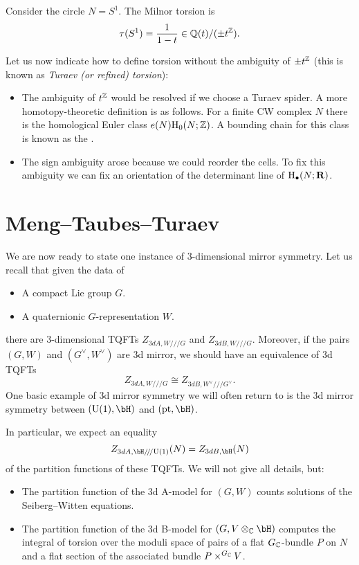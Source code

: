 \begin{example}
	Consider the circle $N=S^1$. The Milnor torsion is
	\[\tau(S^1) = \frac{1}{1-t}\in\mathbb{Q}(t)/(\pm t^{\mathbb{Z}}).\]
\end{example}

Let us now indicate how to define torsion without the ambiguity of $\pm t^{\mathbb{Z}}$ (this is known as \emph{Turaev (or refined) torsion}):
\begin{itemize}
	\item The ambiguity of $t^{\mathbb{Z}}$ would be resolved if we choose a Turaev spider. A more homotopy-theoretic definition is as follows. For a finite CW complex $N$ there is the homological Euler class $e(N)\mathrm{H}_0(N; \mathbb{Z})$. A bounding chain for this class is known as the .
	
	\item The sign ambiguity arose because we could reorder the cells. To fix this ambiguity we can fix an orientation of the determinant line of $\mathrm{H}_\bullet(N;\mathbf{R})$.
\end{itemize}

\section{Meng--Taubes--Turaev}

We are now ready to state one instance of 3-dimensional mirror symmetry. Let us recall that given the data of
\begin{itemize}
	\item A compact Lie group $G$.
	\item A quaternionic $G$-representation $W$.
\end{itemize}
there are 3-dimensional TQFTs $Z_{3dA, W/\!/\!/G}$ and $Z_{3dB, W/\!/\!/G}$. Moreover, if the pairs $(G, W)$ and $(G^\vee, W^\vee)$ are 3d mirror, we should have an equivalence of 3d TQFTs
\[Z_{3dA, W/\!/\!/G}\cong Z_{3dB, W^\vee/\!/\!/G^\vee}.\]
One basic example of 3d mirror symmetry we will often return to is the 3d mirror symmetry between $(\U(1), \bH)$ and $(\pt, \bH)$.

In particular, we expect an equality
\[Z_{3dA, \bH/\!/\!/\U(1)}(N) = Z_{3dB, \bH}(N)\]
of the partition functions of these TQFTs. We will not give all details, but:
\begin{itemize}
	\item The partition function of the 3d A-model for $(G, W)$ counts solutions of the Seiberg--Witten equations.
	\item The partition function of the 3d B-model for $(G, V\otimes_\C \bH)$ computes the integral of torsion over the moduli space of pairs of a flat $G_{\mathbb{C}}$-bundle $P$ on $N$ and a flat section of the associated bundle $P\times^{G_{\mathbb{C}}} V$.
\end{itemize}

